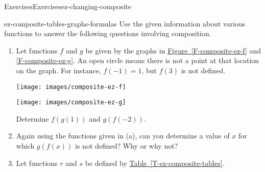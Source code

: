 \typeout{************************************************}
\typeout{************************************************}
%
\begin{exercises-subsection}{Exercises}{}{Exercises}{}{}{ez-changing-composite}
\begin{divisionexercise}{1}{}{}{ez-composite-tables-graphs-formulas}%
\hypertarget{p-510}{}%
Use the given information about various functions to answer the following questions involving composition.%
\par
\hypertarget{p-511}{}%
\leavevmode%
\begin{enumerate}[label=\alph*.]
\item\hypertarget{li-227}{}\hypertarget{p-512}{}%
Let functions \(f\) and \(g\) be given by the graphs in \hyperref[F-composite-ez-f]{Figure~\ref{F-composite-ez-f}} and \hyperref[F-composite-ez-g]{\ref{F-composite-ez-g}}.  An open circle means there is not a point at that location on the graph.  For instance, \(f(-1) = 1\), but \(f(3)\) is not defined.%
\begin{sidebyside}{2}{0}{0}{0}%
\begin{sbspanel}{0.5}%
\texttt{[image: images/composite-ez-f]}
\end{sbspanel}%
\begin{sbspanel}{0.5}%
\texttt{[image: images/composite-ez-g]}
\end{sbspanel}%
\nopagebreak%
\begin{sbscaption}{0.5}%
\end{sbscaption}%
\begin{sbscaption}{0.5}%
\end{sbscaption}%
\end{sidebyside}%
\par
\hypertarget{p-513}{}%
Determine \(f(g(1))\) and \(g(f(-2))\).%
\item\hypertarget{li-228}{}\hypertarget{p-514}{}%
Again using the functions given in (a), can you determine a value of \(x\) for which \(g(f(x))\) is not defined?  Why or why not?%
\item\hypertarget{li-229}{}\hypertarget{p-515}{}%
Let functions \(r\) and \(s\) be defined by \hyperref[T-ez-composite-tables]{Table~\ref{T-ez-composite-tables}}.%
\begin{table}
\centering
\begin{tabular}{rrrrrrrrrr}

\end{tabular}
\end{table}
\end{enumerate}
\end{divisionexercise}
\end{exercises-subsection}

